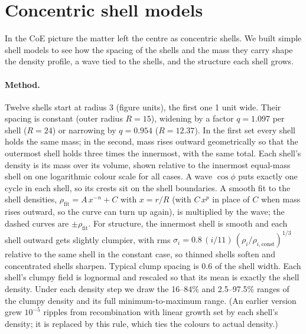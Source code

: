 \documentclass[aps,prd,twocolumn,nofootinbib,superscriptaddress,floatfix]{revtex4-2}
\begin{document}
\section{Concentric shell models}\label{sec:shells}
In the CoE picture the matter left the centre as concentric shells. We built simple shell models to see how the spacing of the shells and the mass they carry shape the density profile, a wave tied to the shells, and the structure each shell grows.

\paragraph*{Method.} Twelve shells start at radius 3 (figure units), the first one 1 unit wide. Their spacing is constant (outer radius $R=15$), widening by a factor $q=1.097$ per shell ($R=24$) or narrowing by $q=0.954$ ($R=12.37$). In the first set every shell holds the same mass; in the second, mass rises outward geometrically so that the outermost shell holds three times the innermost, with the same total. Each shell's density is its mass over its volume, shown relative to the innermost equal-mass shell on one logarithmic colour scale for all cases. A wave $\cos\phi$ puts exactly one cycle in each shell, so its crests sit on the shell boundaries. A smooth fit to the shell densities, $\rho_\mathrm{fit}=A\,x^{-n}+C$ with $x=r/R$ (with $C\,x^{p}$ in place of $C$ when mass rises outward, so the curve can turn up again), is multiplied by the wave; the dashed curves are $\pm\rho_\mathrm{fit}$. For structure, the innermost shell is smooth and each shell outward gets slightly clumpier, with rms $\sigma_i=0.8\,(i/11)\,(\rho_i/\rho_{i,\mathrm{const}})^{1/3}$ relative to the same shell in the constant case, so thinned shells soften and concentrated shells sharpen. Typical clump spacing is 0.6 of the shell width. Each shell's clumpy field is lognormal and rescaled so that its mean is exactly the shell density. Under each density step we draw the 16--84\% and 2.5--97.5\% ranges of the clumpy density and its full minimum-to-maximum range. (An earlier version grew $10^{-5}$ ripples from recombination with linear growth set by each shell's density; it is replaced by this rule, which ties the colours to actual density.)
\end{document}
